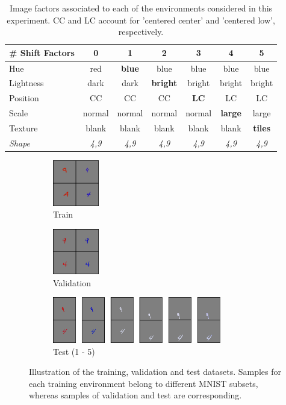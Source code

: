 \begin{table}[H]
    \centering
    \begin{tabular}{l|c|c|c|c|c|c}
    \# Shift Factors & 0 & 1 & 2 & 3 & 4 & 5 \\
    \midrule
    Hue & red & \textbf{blue} & blue & blue & blue & blue \\
    Lightness & dark & dark & \textbf{bright} & bright & bright & bright \\
    Position  & CC & CC & CC & \textbf{LC} & LC & LC \\
    Scale  & normal & normal & normal & normal & \textbf{large} & large \\
    Texture & blank & blank & blank & blank & blank & \textbf{tiles} \\
    \textit{Shape} & \textit{4,9} &  \textit{4,9} &  \textit{4,9} & \textit{4,9} & \textit{4,9} & \textit{4,9} \\
    \bottomrule
    \end{tabular}
    \caption{
    Image factors associated to each of the environments considered in this experiment. CC and LC account
    for 'centered center' and 'centered low', respectively.
    }
    \label{tab:data_shift_table}
    \end{table}


\begin{figure}[H]
    \centering
    \begin{subfigure}[b]{0.2\textwidth}
        \centering
        \includegraphics[height=2cm]{img/results_discussion/datashift/dsimages/train_collage.png}
        \caption*{Train}
    \end{subfigure}%
    \hfill
    \begin{subfigure}[b]{0.2\textwidth}
        \centering
        \includegraphics[height=2cm]{img/results_discussion/datashift/dsimages/val_collage.png}
        \caption*{Validation}
    \end{subfigure}%
    \hfill
    \begin{subfigure}[b]{0.6\textwidth}
        \centering
        \includegraphics[height=2cm]{img/results_discussion/datashift/dsimages/test_collage2.png}
        \caption*{Test (1 - 5)}
    \end{subfigure}
    \caption{
    Illustration of the training, validation and test datasets. Samples for each
    training environment belong to different MNIST subsets, whereas samples of
    validation and test are corresponding.
    }
    \label{fig:data_shift_images}
\end{figure}


